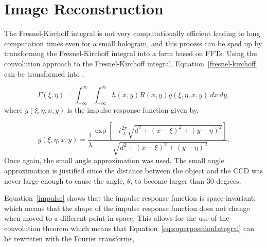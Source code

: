

    \section{Image Reconstruction}

    The Fresnel-Kirchoff integral is not very computationally efficient
    leading to long computation times even for a small hologram, and this process can be
    sped up by transforming the Fresnel-Kirchoff integral into a form based
    on FFTs.
    Using the convolution approach to the Fresnel-Kirchoff integral,
    Equation~\ref{fresnel-kirchoff} can be transformed into
    \cite{schnars_digital_2002},

    \begin{equation}
        \Gamma(\xi,\eta) = \int_{-\infty}^{\infty}\int_{-\infty}^{\infty}
        h(x,y)R(x,y) g(\xi,\eta,x,y)~dx~dy,
        \label{eq:superpositionIntegral}
    \end{equation}
    where $g(\xi,\eta,x,y)$ is the impulse response function given by,

    \begin{equation}
        g(\xi,\eta,x,y)=\frac{1}{\lambda}\frac{\exp\left[
        -i\frac{2\pi}{\lambda}\sqrt{d^{2}+(x-\xi)^{2}+(y-\eta)^{2}}
    \right]}{\sqrt{d^{2}+(x-\xi)^{2}+(y-\eta)^{2}}}.
        \label{impulse}
    \end{equation}
    Once again, the small angle approximation was used. The small angle
    approximation is justified since the distance between the object and the
    CCD was never large enough to cause the angle,
    $\theta$, to become larger than 30 degrees. 

    Equation~\ref{impulse}
    shows that the impulse response function is space-invariant,
    which means that the shape of the impulse response function does not change
    when moved to a different point in space.
    This allows for the
    use of the convolution theorem which means that 
    Equation~\ref{eq:superpositionIntegral} 
    can be rewritten with the Fourier transforms,

